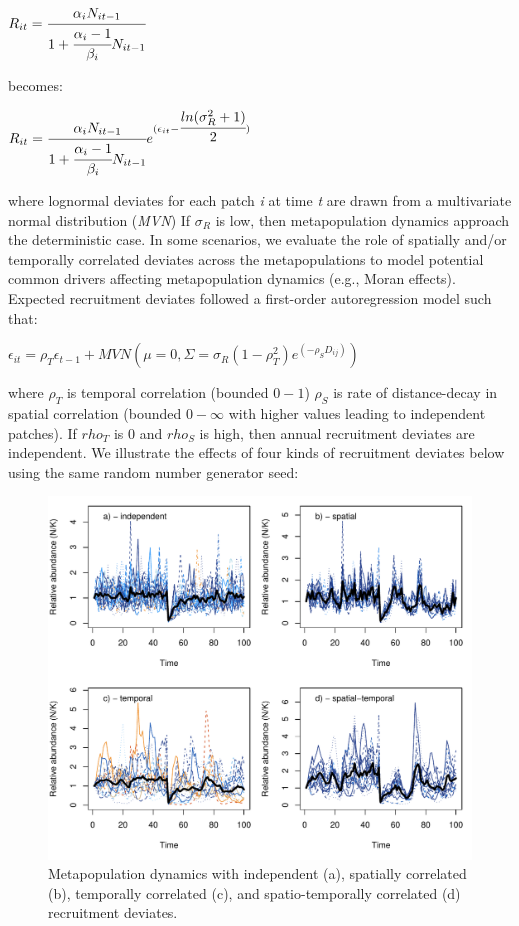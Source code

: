 \documentclass[]{article}
\begin{document}
\(R_{it}=\cfrac{\alpha_iN_{it-1}}{1+\cfrac{\alpha_i-1}{\beta_i}N_{it-1}}\)

becomes:

\(R_{it}=\cfrac{\alpha_iN_{it-1}}{1+\cfrac{\alpha_i-1}{\beta_i}N_{it-1}}e^{(\epsilon_{it}-\cfrac{ln(\sigma_{R}^2+1)}{2})}\)

where lognormal deviates for each patch \emph{i} at time \emph{t} are
drawn from a multivariate normal distribution (\emph{MVN}) If
\(\sigma_R\) is low, then metapopulation dynamics approach the
deterministic case. In some scenarios, we evaluate the role of spatially
and/or temporally correlated deviates across the metapopulations to
model potential common drivers affecting metapopulation dynamics (e.g.,
Moran effects). Expected recruitment deviates followed a first-order
autoregression model such that:

\(\epsilon_{it}=\rho_T\epsilon_{t-1}+MVN(\mu=0,\Sigma=\sigma_R(1-\rho_T^2)e^{(-\rho_SD_{ij})})\)

where \(\rho_T\) is temporal correlation (bounded \(0-1\)) \(\rho_S\) is
rate of distance-decay in spatial correlation (bounded \(0-\infty\) with
higher values leading to independent patches). If \(rho_T\) is 0 and
\(rho_S\) is high, then annual recruitment deviates are independent. We
illustrate the effects of four kinds of recruitment deviates below using
the same random number generator seed:

\begin{figure}[H]

{\centering \includegraphics{Managing_for_ecological_surprises_in_metapopulations_makeHTML_files/figure-latex/independent stochasticity-1} 

}

\caption{Metapopulation dynamics with independent (a), spatially correlated (b), temporally correlated (c), and spatio-temporally correlated (d) recruitment deviates.}\label{fig:independent stochasticity}
\end{figure}
\end{document}
